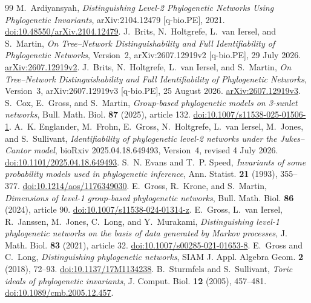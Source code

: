 \documentclass[11pt]{article}
\theoremstyle{remark}\newtheorem{remark}[theorem]{Remark}
\begin{document}
\begin{thebibliography}{99}
M.~Ardiyansyah, \emph{Distinguishing Level-2 Phylogenetic Networks Using Phylogenetic Invariants}, arXiv:2104.12479 [q-bio.PE], 2021. \href{https://doi.org/10.48550/arXiv.2104.12479}{doi:10.48550/arXiv.2104.12479}.
J.~Brits, N.~Holtgrefe, L.~van Iersel, and S.~Martin, \emph{On Tree--Network Distinguishability and Full Identifiability of Phylogenetic Networks}, Version~2, arXiv:2607.12919v2 [q-bio.PE], 29 July 2026. \href{https://arxiv.org/abs/2607.12919v2}{arXiv:2607.12919v2}.
J.~Brits, N.~Holtgrefe, L.~van Iersel, and S.~Martin, \emph{On Tree--Network Distinguishability and Full Identifiability of Phylogenetic Networks}, Version~3, arXiv:2607.12919v3 [q-bio.PE], 25 August 2026. \href{https://arxiv.org/abs/2607.12919v3}{arXiv:2607.12919v3}.
S.~Cox, E.~Gross, and S.~Martin, \emph{Group-based phylogenetic models on 3-sunlet networks}, Bull. Math. Biol. \textbf{87} (2025), article 132. \href{https://doi.org/10.1007/s11538-025-01506-1}{doi:10.1007/s11538-025-01506-1}.
A.~K. Englander, M.~Frohn, E.~Gross, N.~Holtgrefe, L.~van Iersel, M.~Jones, and S.~Sullivant, \emph{Identifiability of phylogenetic level-2 networks under the Jukes--Cantor model}, bioRxiv 2025.04.18.649493, Version~4, revised 4 July 2026. \href{https://doi.org/10.1101/2025.04.18.649493}{doi:10.1101/2025.04.18.649493}.
S.~N. Evans and T.~P. Speed, \emph{Invariants of some probability models used in phylogenetic inference}, Ann. Statist. \textbf{21} (1993), 355--377. \href{https://doi.org/10.1214/aos/1176349030}{doi:10.1214/aos/1176349030}.
E.~Gross, R.~Krone, and S.~Martin, \emph{Dimensions of level-1 group-based phylogenetic networks}, Bull. Math. Biol. \textbf{86} (2024), article 90. \href{https://doi.org/10.1007/s11538-024-01314-z}{doi:10.1007/s11538-024-01314-z}.
E.~Gross, L.~van Iersel, R.~Janssen, M.~Jones, C.~Long, and Y.~Murakami, \emph{Distinguishing level-1 phylogenetic networks on the basis of data generated by Markov processes}, J. Math. Biol. \textbf{83} (2021), article 32. \href{https://doi.org/10.1007/s00285-021-01653-8}{doi:10.1007/s00285-021-01653-8}.
E.~Gross and C.~Long, \emph{Distinguishing phylogenetic networks}, SIAM J. Appl. Algebra Geom. \textbf{2} (2018), 72--93. \href{https://doi.org/10.1137/17M1134238}{doi:10.1137/17M1134238}.
B.~Sturmfels and S.~Sullivant, \emph{Toric ideals of phylogenetic invariants}, J. Comput. Biol. \textbf{12} (2005), 457--481. \href{https://doi.org/10.1089/cmb.2005.12.457}{doi:10.1089/cmb.2005.12.457}.
\end{thebibliography}
\end{document}
